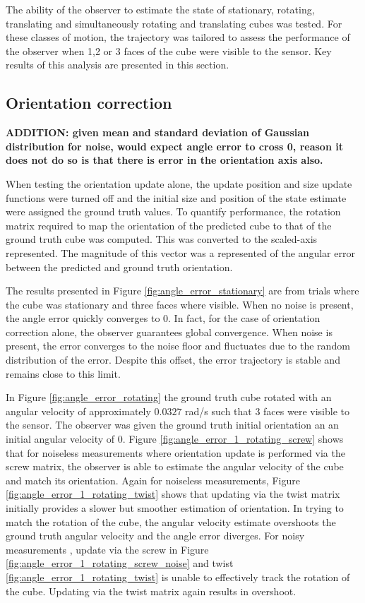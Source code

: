 The ability of the observer to estimate the state of stationary, rotating, translating and simultaneously rotating and translating cubes was tested. For these classes of motion, the trajectory was tailored to assess the performance of the observer when 1,2 or 3 faces of the cube were visible to the sensor. Key results of this analysis are presented in this section.

\subsection{Orientation correction}
\textbf{ADDITION: given mean and standard deviation of Gaussian distribution for noise, would expect angle error to cross 0, reason it does not do so is that there is error in the orientation axis also.}

When testing the orientation update alone, the update position and size update functions were turned off and the initial size and position of the state estimate were assigned the ground truth values. To quantify performance, the rotation matrix required to map the orientation of the predicted cube to that of the ground truth cube was computed. This was converted to the scaled-axis represented. The magnitude of this vector was a represented of the angular error between the predicted and ground truth orientation.

The results presented in Figure \ref{fig:angle_error_stationary} are from trials where the cube was stationary and three faces where visible. When no noise is present, the angle error quickly converges to 0. In fact, for the case of orientation correction alone, the observer guarantees global convergence. When noise is present, the error converges to the noise floor and fluctuates due to the random distribution of the error. Despite this offset, the error trajectory is stable and remains close to this limit. 

In Figure \ref{fig:angle_error_rotating} the ground truth cube rotated with an angular velocity of approximately $0.0327$ rad/s such that 3 faces were visible to the sensor. The observer was given the ground truth initial orientation an an initial angular velocity of 0.
Figure \ref{fig:angle_error_1_rotating_screw} shows that for noiseless measurements where orientation update is performed via the screw matrix, the observer is able to estimate the angular velocity of the cube and match its orientation. Again for noiseless measurements, Figure \ref{fig:angle_error_1_rotating_twist} shows that updating via the twist matrix initially provides a slower but smoother estimation of orientation. In trying to match the rotation of the cube, the angular velocity estimate overshoots the ground truth angular velocity and the angle error diverges. 
For noisy measurements , update via the screw in Figure \ref{fig:angle_error_1_rotating_screw_noise} and twist \ref{fig:angle_error_1_rotating_twist} is unable to effectively track the rotation of the cube. Updating via the twist matrix again results in overshoot. 

